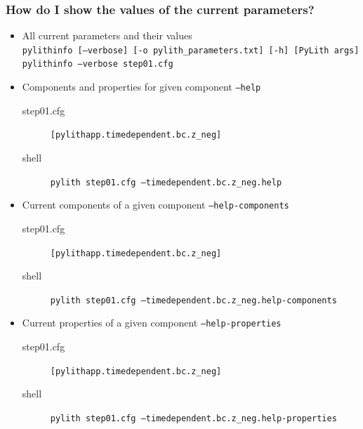 \documentclass{beamer}
\newcommand{\cfg}[1]{{\tiny\tt \color{blue}#1}}
\newcommand{\cmd}[1]{{\tiny\tt \color{ltred}#1}}
\begin{document}
\begin{frame}
  \frametitle{How do I show the values of the current parameters?}

  \begin{itemize}
  \item All current parameters and their values\\
    \cmd{pylithinfo [--verbose] [-o pylith\_parameters.txt] [-h] [PyLith args]}\\
    \cmd{pylithinfo --verbose step01.cfg}
  \item Components and properties for given component \cmd{--help}
    \begin{description}
    \item[step01.cfg] \cfg{[pylithapp.timedependent.bc.z\_neg]}
    \item[shell] \cmd{pylith step01.cfg --timedependent.bc.z\_neg.help}
    \end{description}
  \item Current components of a given component \cmd{--help-components}
    \begin{description}
    \item[step01.cfg] \cfg{[pylithapp.timedependent.bc.z\_neg]}
    \item[shell] \cmd{pylith step01.cfg --timedependent.bc.z\_neg.help-components}
    \end{description}
  \item Current properties of a given component \cmd{--help-properties}
    \begin{description}
    \item[step01.cfg] \cfg{[pylithapp.timedependent.bc.z\_neg]}
    \item[shell] \cmd{pylith step01.cfg --timedependent.bc.z\_neg.help-properties}
    \end{description}
  \end{itemize}

\end{frame}
\end{document}

